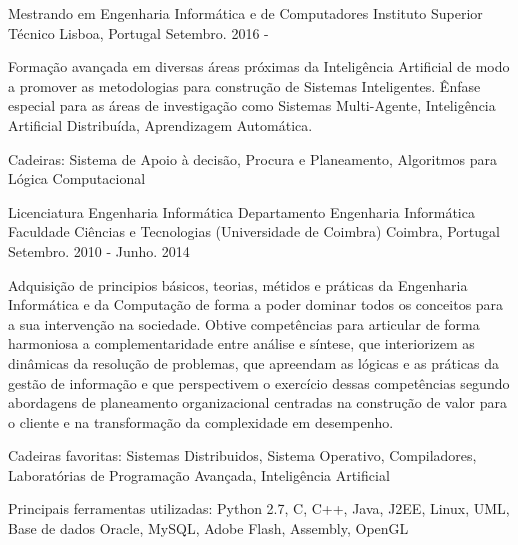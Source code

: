 


\begin{cventries}


\cventry
{Mestrando em Engenharia Informática e de Computadores} %
{Instituto Superior Técnico} %
{Lisboa, Portugal} %
{Setembro. 2016 - } %
{  %
\begin{cvitems}
\item {Formação avançada em diversas áreas próximas da Inteligência Artificial de modo a promover as metodologias para construção de Sistemas Inteligentes. Ênfase especial para as áreas de investigação como Sistemas Multi-Agente, Inteligência Artificial Distribuída, Aprendizagem Automática.}
\item{Cadeiras: Sistema de Apoio à decisão, Procura e Planeamento, Algoritmos para Lógica Computacional}
\
\end{cvitems}
}


\cventry
{Licenciatura Engenharia Informática} %
{Departamento Engenharia Informática  Faculdade Ciências e Tecnologias (Universidade de Coimbra)} %
{Coimbra, Portugal} %
{Setembro. 2010 - Junho. 2014} %
{  %
\begin{cvitems}
\item {Adquisição de principios básicos, teorias, métidos e práticas da Engenharia Informática e da Computação de forma a poder dominar todos os conceitos para a sua intervenção na sociedade. Obtive competências para articular de forma harmoniosa a complementaridade entre análise e síntese, que interiorizem as dinâmicas da resolução de problemas, que apreendam as lógicas e as práticas da gestão de informação e que perspectivem o exercício dessas competências segundo abordagens de planeamento organizacional centradas na construção de valor para o cliente e na transformação da complexidade em desempenho. }
\item{Cadeiras favoritas: Sistemas Distribuidos, Sistema Operativo, Compiladores, Laboratórias de Programação Avançada, Inteligência Artificial}
\item{Principais ferramentas utilizadas: Python 2.7, C, C++, Java, J2EE, Linux, UML, Base de dados Oracle, MySQL, Adobe Flash, Assembly, OpenGL }
\
\end{cvitems}
}



\end{cventries}
